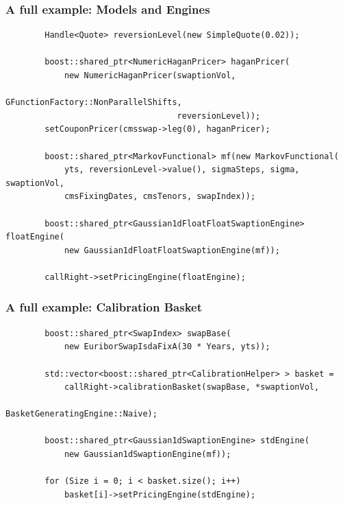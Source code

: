 \documentclass{beamer}
\begin{document}
\begin{frame}[fragile]
\frametitle{A full example: Models and Engines}
\begin{verbatim}
        Handle<Quote> reversionLevel(new SimpleQuote(0.02));

        boost::shared_ptr<NumericHaganPricer> haganPricer(
            new NumericHaganPricer(swaptionVol,
                                   GFunctionFactory::NonParallelShifts,
                                   reversionLevel));
        setCouponPricer(cmsswap->leg(0), haganPricer);

        boost::shared_ptr<MarkovFunctional> mf(new MarkovFunctional(
            yts, reversionLevel->value(), sigmaSteps, sigma, swaptionVol,
            cmsFixingDates, cmsTenors, swapIndex));

        boost::shared_ptr<Gaussian1dFloatFloatSwaptionEngine> floatEngine(
            new Gaussian1dFloatFloatSwaptionEngine(mf));

        callRight->setPricingEngine(floatEngine);
\end{verbatim}
\end{frame}

\begin{frame}[fragile]
\frametitle{A full example: Calibration Basket}
\begin{verbatim}
        boost::shared_ptr<SwapIndex> swapBase(
            new EuriborSwapIsdaFixA(30 * Years, yts));

        std::vector<boost::shared_ptr<CalibrationHelper> > basket =
            callRight->calibrationBasket(swapBase, *swaptionVol,
                                         BasketGeneratingEngine::Naive);

        boost::shared_ptr<Gaussian1dSwaptionEngine> stdEngine(
            new Gaussian1dSwaptionEngine(mf));

        for (Size i = 0; i < basket.size(); i++)
            basket[i]->setPricingEngine(stdEngine);
\end{verbatim}
\end{frame}
\end{document}
